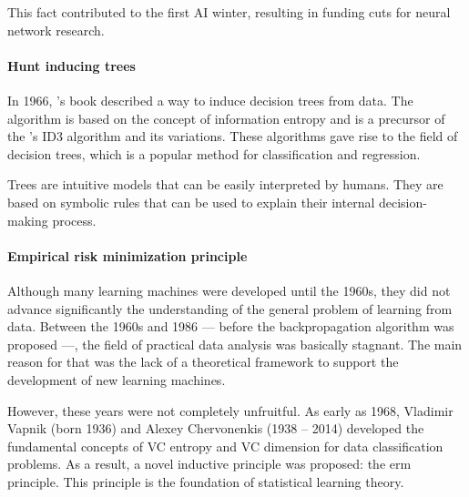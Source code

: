 This fact contributed to the first AI winter, resulting in funding cuts for neural
network research.

\paragraph{Hunt inducing trees}

In 1966, \citeauthor{Hunt1966}'s book described a way to induce decision trees from
data.  The algorithm is based on the concept of information entropy and is a precursor of
the \citeauthor{Quinlan1986}'s ID3 algorithm and its variations.
These algorithms gave rise to the field of decision trees, which is a popular method for
classification and regression.

Trees are intuitive models that can be easily interpreted by humans.  They are based on
symbolic rules that can be used to explain their internal decision-making process.


\paragraph{Empirical risk minimization principle}

Although many learning machines were developed until the 1960s, they did not advance
significantly the understanding of the general problem of learning from data.  Between
the 1960s and 1986 --- before the backpropagation algorithm was proposed ---, the field of practical
data analysis was basically stagnant.  The main reason for that was the lack of a
theoretical framework to support the development of new learning machines.

However, these years were not completely unfruitful.  As early as 1968, Vladimir Vapnik
(born 1936)
and Alexey Chervonenkis (1938 -- 2014) developed the fundamental concepts of VC entropy
and VC dimension for data classification problems.  As a result, a novel inductive
principle was proposed: the \gls{erm} principle.
This principle is the foundation of statistical learning theory.

%

